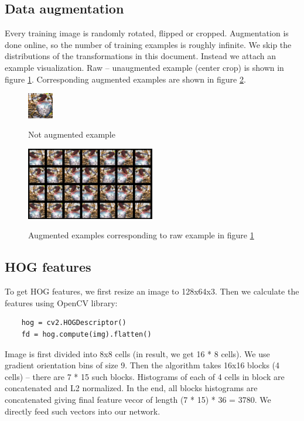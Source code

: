 \documentclass[a4paper]{article}
\begin{document}
\begin{multicols}{2}
\subsection{Data augmentation}
\label{augmentation}
Every training image is randomly rotated, flipped or cropped.
Augmentation is done online, so the number of training examples is
roughly infinite.
We skip the distributions of the transformations in this document.
Instead we attach an example visualization.
Raw -- unaugmented example (center crop) is shown in figure \ref{fig:aug1}.
Corresponding augmented examples are shown in figure \ref{fig:aug2}.


\begin{figure}[H]
    \caption[]{Not augmented example}
    \centering
    \includegraphics[page=2,width=0.1\textwidth]{aug1.png}
    \label{fig:aug1}
\end{figure}

\begin{figure}[H]
    \caption[]{Augmented examples corresponding to raw example in figure \ref{fig:aug1}}
    \centering
    \includegraphics[page=2,width=0.5\textwidth]{aug2.png}
    \label{fig:aug2}
\end{figure}

\subsection{HOG features}
To get HOG features, we first resize an image to 128x64x3.
Then we calculate the features using OpenCV library:
\begin{verbatim}
    hog = cv2.HOGDescriptor()
    fd = hog.compute(img).flatten()
\end{verbatim}

Image is first divided into 8x8 cells (in result, we get 16 * 8 cells).
We use gradient orientation bins of size 9.
Then the algorithm takes 16x16 blocks (4 cells) --
there are 7 * 15 such blocks.
Histograms of each of 4 cells in block are concatenated and L2 normalized.
In the end, all blocks histograms are concatenated giving
final feature vecor of length (7 * 15) * 36 = 3780.
We directly feed such vectors into our network.


\end{multicols}
\end{document}
